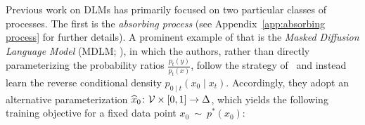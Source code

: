
  Previous work on DLMs has primarily focused on two particular classes of processes. The first is the \textit{absorbing process} (see Appendix~\ref{app:absorbing process} for further details). A prominent example of that is the \textit{Masked Diffusion Language Model} (MDLM; \citealp{sahoo2024simple, shi2024simplified}), in which the authors, rather than directly parameterizing the probability ratios $\frac{p_t(y)}{p_t(x)}$, follow the strategy of~\citet{ho2020denoising, austin2021structured, campbell2022continuous} and instead learn the reverse conditional density $p_{0\mid t}(x_0 \mid x_t)$. Accordingly, they adopt an alternative parameterization $\widehat{x}_0\colon \mathcal{V} \times [0, 1] \to \Delta$, which yields the following training objective for a fixed data point $x_0~\sim~p^*(x_0)$:
